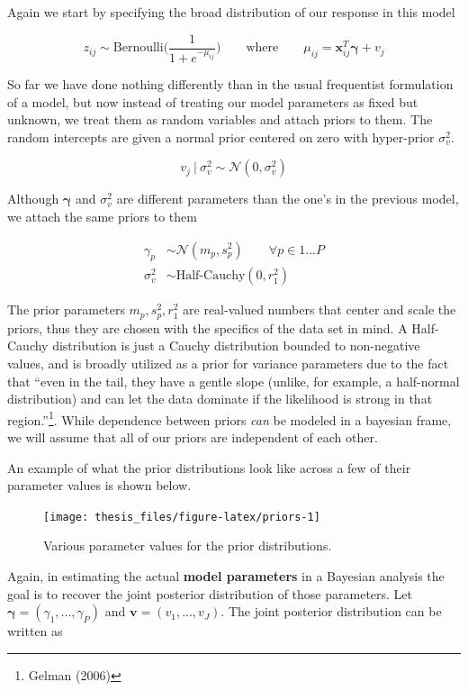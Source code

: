 \documentclass[12pt,twoside]{reedthesis}
\begin{document}
Again we start by specifying the broad distribution of our response in this model

\[
z_{ij} \sim \text{Bernoulli}\Bigg(\frac{1}{1 + e^{-\mu_{ij}}}\Bigg) \qquad \text{where} \qquad \mu_{ij} =\mathbf{x}_{ij}^T\boldsymbol{\gamma} + v_j
\]

So far we have done nothing differently than in the usual frequentist formulation of a model, but now instead of treating our model parameters as fixed but unknown, we treat them as random variables and attach priors to them. The random intercepts are given a normal prior centered on zero with hyper-prior \(\sigma_v^2\).

\[
v_j \ | \ \sigma_{v}^2 \sim \mathcal{N}(0, \sigma_{v}^2)
\]

Although \(\boldsymbol{\gamma}\) and \(\sigma_{v}^2\) are different parameters than the one's in the previous model, we attach the same priors to them

\[
\begin{aligned}
\gamma_p &\sim \mathcal{N}(m_p, s_p^2)  \qquad \forall p\in 1...P \\
\sigma_{v}^2 &\sim \text{Half-Cauchy}(0, r_1^2)
\end{aligned}
\]

The prior parameters \(m_p, s_p^2, r_1^2\) are real-valued numbers that center and scale the priors, thus they are chosen with the specifics of the data set in mind. A Half-Cauchy distribution is just a Cauchy distribution bounded to non-negative values, and is broadly utilized as a prior for variance parameters due to the fact that ``even in the tail, they have a gentle slope (unlike, for example, a half-normal distribution) and can let the data dominate if the likelihood is strong in that region.''\footnote{Gelman (2006)}. While dependence between priors \emph{can} be modeled in a bayesian frame, we will assume that all of our priors are independent of each other.

An example of what the prior distributions look like across a few of their parameter values is shown below.
\begin{figure}

{\centering \texttt{[image: thesis\_files/figure-latex/priors-1]} 

}

\caption{Various parameter values for the prior distributions.}\label{fig:priors}
\end{figure}
Again, in estimating the actual \textbf{model parameters} in a Bayesian analysis the goal is to recover the joint posterior distribution of those parameters. Let \(\boldsymbol{\gamma} = (\gamma_1, ...,\gamma_P)\) and \(\mathbf{v} = (v_1, ..., v_J)\). The joint posterior distribution can be written as
\end{document}
